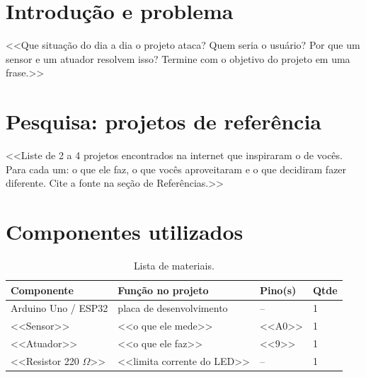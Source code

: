 \documentclass{abntex2}
\begin{document}
\begin{center}
\end{center}

\tableofcontents
\newpage

\section{Introdução e problema}
<<Que situação do dia a dia o projeto ataca? Quem seria o usuário? Por que um sensor e um
atuador resolvem isso? Termine com o objetivo do projeto em uma frase.>>

\section{Pesquisa: projetos de referência}
<<Liste de 2 a 4 projetos encontrados na internet que inspiraram o de vocês. Para cada um:
o que ele faz, o que vocês aproveitaram e o que decidiram fazer diferente. Cite a fonte
na seção de Referências.>>

\section{Componentes utilizados}
\begin{table}[H]
  \centering
  \begin{tabular}{llll}
    \toprule
    \textbf{Componente} & \textbf{Função no projeto} & \textbf{Pino(s)} & \textbf{Qtde} \\
    \midrule
    Arduino Uno / ESP32     & placa de desenvolvimento & --      & 1 \\
    <<Sensor>>              & <<o que ele mede>>       & <<A0>>  & 1 \\
    <<Atuador>>             & <<o que ele faz>>        & <<9>>   & 1 \\
    <<Resistor 220 $\Omega$>> & <<limita corrente do LED>> & --  & 1 \\
    \bottomrule
  \end{tabular}
  \caption{Lista de materiais.}
\end{table}
\end{document}
